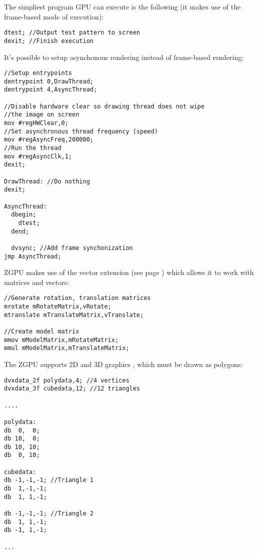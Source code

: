 The simpliest program GPU can execute is the following (it makes use of the frame-based mode of execution):
\begin{verbatim}
dtest; //Output test pattern to screen
dexit; //Finish execution
\end{verbatim}

It's possible to setup asynchonous rendering instead of frame-based rendering:
\begin{verbatim}
//Setup entrypoints
dentrypoint 0,DrawThread; 
dentrypoint 4,AsyncThread;

//Disable hardware clear so drawing thread does not wipe
//the image on screen
mov #regHWClear,0;
//Set asynchronous thread frequency (speed)
mov #regAsyncFreq,200000;
//Run the thread
mov #regAsyncClk,1; 
dexit;

DrawThread: //Do nothing
dexit;

AsyncThread:
  dbegin;
    dtest;
  dend;
  
  dvsync; //Add frame synchonization
jmp AsyncThread;
\end{verbatim}

ZGPU makes use of the vector extension (see page \pageref{vectorext}) which allows it to work with matrices and vectors:
\begin{verbatim}
//Generate rotation, translation matrices
mrotate mRotateMatrix,vRotate;
mtranslate mTranslateMatrix,vTranslate;

//Create model matrix
mmov mModelMatrix,mRotateMatrix;
mmul mModelMatrix,mTranslateMatrix;
\end{verbatim}

The ZGPU supports 2D and 3D graphics , which must be drawn as polygons:
\begin{verbatim}
dvxdata_2f polydata,4; //4 vertices
dvxdata_3f cubedata,12; //12 triangles

....

polydata:
db  0,  0;
db 10,  0;
db 10, 10;
db  0, 10;

cubedata:
db -1,-1,-1; //Triangle 1
db  1,-1,-1;
db  1, 1,-1;

db -1,-1,-1; //Triangle 2
db  1, 1,-1;
db -1, 1,-1;

...
\end{verbatim}

